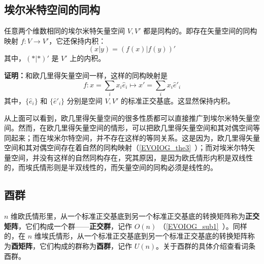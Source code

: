\subsection{埃尔米特空间的同构}
\begin{theorem}{}
任意两个维数相同的埃尔米特矢量空间 $V,V'$ 都是同构的。即存在矢量空间的同构映射 $f:V\rightarrow V'$，它还保持内积：
\begin{equation}
(  x|  y)=(f(  x)|f(  y))'
\end{equation}
其中，$(*|*)'$ 是 $V'$ 上的内积。
\end{theorem}
\textbf{证明：}和欧几里得矢量空间一样，这样的同构映射是
\begin{equation}
f:  x=\sum_{i}x_i  \hat e_i\mapsto  x'=\sum_i x_i \hat e'_i
\end{equation}
其中，$\{ \hat e_i\}$ 和 $\{ \hat e'_i\}$ 分别是空间 $V,V'$ 的标准正交基底。这显然保持内积。

从上面可以看到，欧几里得矢量空间的很多性质都可以直接推广到埃尔米特矢量空间。然而，在欧几里得矢量空间的情形，可以把欧几里得矢量空间和其对偶空间等同起来；而在埃米尔特空间，并不存在这样的等同关系。这是因为，欧几里得矢量空间和其对偶空间存在着自然的同构映射（\autoref{EVOIOG_the3}~）；而对埃米尔特矢量空间，并没有这样的自然同构存在，究其原因，是因为欧氏情形内积是双线性的，而埃氏情形则是半双线性的，而矢量空间的同构必须是线性的。
\subsection{酉群}
 $n$ 维欧氏情形里，从一个标准正交基底到另一个标准正交基底的转换矩阵称为\textbf{正交矩阵}，它们构成一个群——\textbf{正交群}，记作 $O(n)$ （\autoref{EVOIOG_sub1}~）。同样的，在 $n$ 维埃氏情形，从一个标准正交基底到另一个标准正交基底的转换矩阵称为\textbf{酉矩阵}，它们构成的群称为\textbf{酉群}，记作 $U(n)$。关于酉群的具体介绍查看词条酉群。
